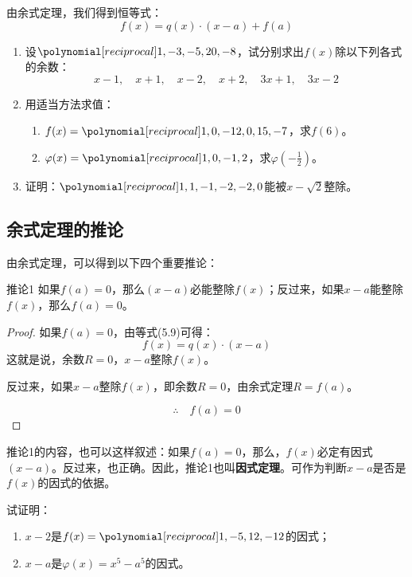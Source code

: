由余式定理，我们得到恒等式：
\begin{equation}
    f(x)=q(x)\cdot (x-a)+f(a)
\end{equation}

\begin{ex}
\begin{enumerate}
    \item 设$\poly{1,-3,-5,20,-8}$，试分别求出$f(x)$除以下列各式的余数：
    \[x-1,\quad x+1,\quad x-2,\quad x+2,\quad 3x+1,\quad 3x-2 \]
    \item 用适当方法求值：
    \begin{enumerate}
        \item $f(x)=\poly{1,0,-12,0,15,-7}$，求$f(6)$。
        \item $\varphi(x)=\poly{1,0,-1,2}$，求$\varphi\left(-\frac{1}{2}\right)$。
    \end{enumerate}
    \item 证明：$\poly{1,1,-1,-2,-2,0}$能被$x-\sqrt{2}$整除。
\end{enumerate}
\end{ex}

\subsection{余式定理的推论}
由余式定理，可以得到以下四个重要推论：
\begin{blk}{推论1}
    如果$f(a)=0$，那么$(x-a)$必能整除$f(x)$；反过来，如果$x-a$能整除$f(x)$，那么$f(a)=0$。
\end{blk}

\begin{proof}
    如果$f(a)=0$，由等式(5.9)可得：
    \[f(x)=q(x) \cdot (x-a)\]    
    这就是说，余数$R=0$，$x-a$整除$f(x)$。
    
    反过来，如果$x-a$整除$f(x)$，即余数$R=0$，由余式定理$R=f(a)$。
    
$$\therefore\quad f (a) =0$$
\end{proof}

推论1的内容，也可以这样叙述：如果$f(a)=0$，那么，$f(x)$必定有因式$(x-a)$。反过来，也正确。因此，推论1也叫\textbf{因式定理}。可作为判断$x-a$是否是$f(x)$的因式的依据。

\begin{example}
    试证明：
\begin{enumerate}
    \item $x-2$是$f(x)=\poly{1,-5,12,-12}$的因式；
    \item $x-a$是$\varphi(x)=x^5-a^5$的因式。
\end{enumerate}
\end{example}

